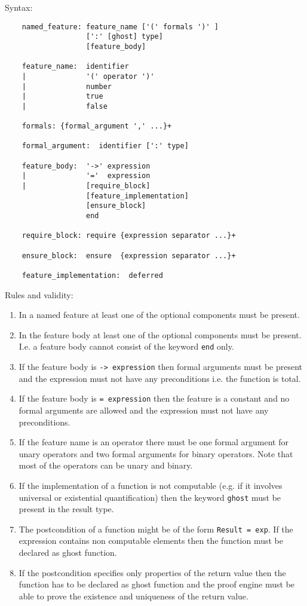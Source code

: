 \noindent Syntax:
\begin{lstlisting}
    named_feature: feature_name ['(' formals ')' ]
                   [':' [ghost] type]
                   [feature_body]

    feature_name:  identifier
    |              '(' operator ')'
    |              number
    |              true
    |              false

    formals: {formal_argument ',' ...}+

    formal_argument:  identifier [':' type]

    feature_body:  '->' expression
    |              '='  expression
    |              [require_block]
                   [feature_implementation]
                   [ensure_block]
                   end

    require_block: require {expression separator ...}+

    ensure_block:  ensure  {expression separator ...}+

    feature_implementation:  deferred
\end{lstlisting}

\noindent Rules and validity:
\begin{enumerate}
\item In a named feature at least one of the optional components must be
  present.

\item In the feature body at least one of the optional components must be
  present. I.e. a feature body cannot consist of the keyword \lstinline!end! only.

\item If the feature body is \lstinline!-> expression! then formal arguments must be
  present and the expression must not have any preconditions i.e. the function
  is total.

\item If the feature body is \lstinline!= expression! then the feature is a constant and
  no formal arguments are allowed and the expression must not have any
  preconditions.

\item If the feature name is an operator there must be one formal argument for
  unary operators and two formal arguments for binary operators. Note that
  most of the operators can be unary and binary.

\item If the implementation of a function is not computable (e.g. if it
  involves universal or existential quantification) then the keyword
  \lstinline!ghost!  must be present in the result type.

\item The postcondition of a function might be of the form
  \lstinline!Result = exp!. If the expression contains non computable elements
  then the function must be declared as ghost function.

\item If the postcondition specifies only properties of the return value then
  the function has to be declared as ghost function and the proof engine must
  be able to prove the existence and uniqueness of the return value.
\end{enumerate}


